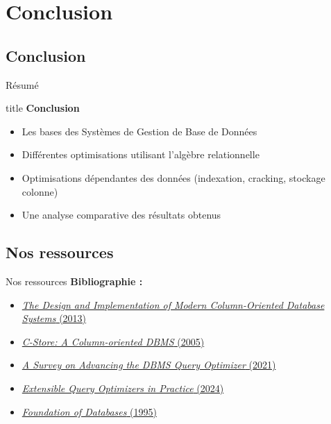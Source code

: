 \documentclass[a4paper,12pt]{beamer}
\begin{document}
\section{Conclusion}

\subsection{Conclusion}

\begin{frame}{Résumé}
    \vspace{0.3cm}
    \begin{beamercolorbox}[
        wd=\textwidth, rounded=true, shadow=true,
        sep=8pt, center
    ]{title}
        {\Large\bfseries Conclusion}
    \end{beamercolorbox}
    \vspace{0.4cm}
    \begin{itemize}
        \item Les bases des Systèmes de Gestion de Base de Données
        \item Différentes optimisations utilisant l'algèbre relationnelle
        \item Optimisations dépendantes des données (indexation, cracking, stockage colonne)
        \item Une analyse comparative des résultats obtenus
    \end{itemize}
\end{frame}

\subsection{Nos ressources}

\begin{frame}{Nos ressources}
    \textbf{Bibliographie :}
    \begin{itemize}
        \item \href{https://drive.google.com/file/d/1KNmuRBf8CV-s-zqdkUEP8iyYlPgFiglb/view?usp=drive_link}%
              {\textit{The Design and Implementation of Modern Column-Oriented Database Systems} (2013)}
        \item \href{https://web.stanford.edu/class/cs345d-01/rl/cstore.pdf}%
              {\textit{C-Store: A Column-oriented DBMS} (2005)}
        \item \href{https://link.springer.com/content/pdf/10.1007/s41019-020-00149-7.pdf}%
              {\textit{A Survey on Advancing the DBMS Query Optimizer} (2021)}
        \item \href{https://www.microsoft.com/en-us/research/wp-content/uploads/2024/12/Extensible-Query-Optimizers-in-Practice.pdf}%
              {\textit{Extensible Query Optimizers in Practice} (2024)}
        \item \href{http://webdam.inria.fr/Alice/}%
              {\textit{Foundation of Databases} (1995)}
    \end{itemize}
\end{frame}
\end{document}
